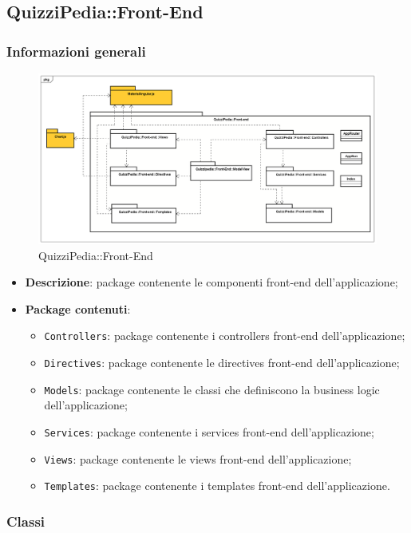 \subsection{QuizziPedia::Front-End}
\subsubsection{Informazioni generali}
\label{QuizziPedia::Front-End}
\begin{figure}[ht]
	\centering
	\includegraphics[scale=0.40]{UML/Package/QuizziPedia_Front-end.png}
	\caption{QuizziPedia::Front-End}
\end{figure}
\FloatBarrier
	\begin{itemize}
		\item \textbf{Descrizione}: package contenente le componenti front-end dell'applicazione;
		\item \textbf{Package contenuti}:
		\begin{itemize}
			\item \texttt{Controllers}: package contenente i controllers front-end dell'applicazione;
			\item \texttt{Directives}: package contenente le directives front-end dell'applicazione;
			\item \texttt{Models}: package contenente le classi che definiscono la business logic dell'applicazione;
			\item \texttt{Services}: package contenente i services front-end dell'applicazione;
			\item \texttt{Views}: package contenente le views front-end dell'applicazione;
			\item \texttt{Templates}: package contenente i templates front-end dell'applicazione.
		\end{itemize}
	\end{itemize}

\subsubsection{Classi}
	
	
	